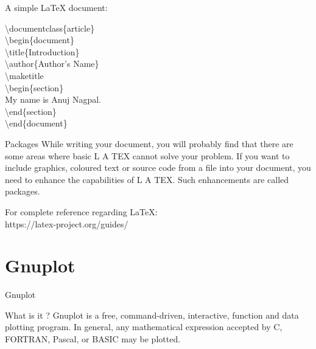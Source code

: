 \documentclass[pdf]{beamer}
\begin{document}
\begin{frame}
A simple \LaTeX{} document:
\begin{example}
\textbackslash documentclass\{article\} \\
\textbackslash begin\{document\}\\
\textbackslash title\{Introduction\}\\
\textbackslash author\{Author's Name\}\\
\textbackslash maketitle \\
\textbackslash begin\{section\} \\
My name is Anuj Nagpal. \\
\textbackslash end\{section\} \\
\textbackslash end\{document\}
\end{example}
\end{frame}

\begin{frame}

\begin{block}{Packages}
While writing your document, you will probably find that there are some
areas where basic L A TEX cannot solve your problem. If you want to include
graphics, coloured text or source code from a file into your document, you
need to enhance the capabilities of L A TEX. Such enhancements are called
packages.
\end{block}

\begin{block}{}
For complete reference regarding \LaTeX{}: \\
https://latex-project.org/guides/
\end{block}
\end{frame}

\section{Gnuplot}

\begin{frame}{Gnuplot}
	\begin{block}{What is it ?}
	Gnuplot is a free, command-driven, interactive, function and data plotting program. In general, any mathematical expression accepted by C, FORTRAN, Pascal, or BASIC may be plotted. 
	\end{block}
\end{frame}	
	
\end{document}
